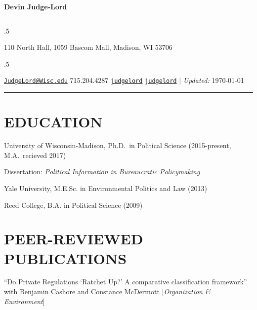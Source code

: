 \documentclass[11pt,]{article}
\providecommand{\tightlist}{%
  \setlength{\itemsep}{0pt}\setlength{\parskip}{0pt}}
\renewenvironment{itemize}{
  \begin{list}{}{
    \setlength{\leftmargin}{1.5em}
  }
}{
  \end{list}
}
\begin{document}
\centerline{\huge \bf Devin Judge-Lord}

\vspace{2 mm}

\hrule

\vspace{2 mm}


\moveleft.5\hoffset\centerline{110 North Hall, 1059 Bascom Mall, Madison, WI 53706}
\moveleft.5\hoffset\centerline{ \faEnvelopeO \hspace{1 mm} \href{mailto:}{\tt \href{mailto:JudgeLord@Wisc.edu}{\nolinkurl{JudgeLord@Wisc.edu}}} \hspace{1 mm}  \faPhone \hspace{1 mm}  715.204.4287  \hspace{1 mm}  \faGithub \hspace{1 mm} \href{http://github.com/judgelord}{\tt judgelord} \hspace{1 mm}   \faTwitter \hspace{1 mm} \href{https:/twitter.com/judgelord}{\tt judgelord} \hspace{1 mm}    | \emph{Updated:} \today}

\vspace{2 mm}

\hrule


\hypertarget{education}{%
\section{EDUCATION}\label{education}}

University of Wisconsin-Madison, Ph.D.~in Political Science
(2015-present, M.A.~recieved 2017)

\begin{itemize}
\tightlist
\item
  Dissertation: \emph{Political Information in Bureaucratic
  Policymaking}
\end{itemize}

Yale University, M.E.Sc. in Environmental Politics and Law (2013)

Reed College, B.A. in Political Science (2009)

\hypertarget{peer-reviewed-publications}{%
\section{PEER-REVIEWED PUBLICATIONS}\label{peer-reviewed-publications}}

``Do Private Regulations `Ratchet Up?' A comparative classification
framework'' with Benjamin Cashore and Constance McDermott
{[}\emph{Organization \& Environment}{]}
\end{document}
